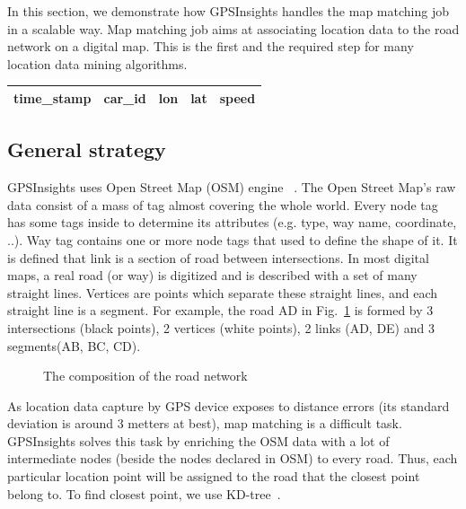 \documentclass{acm_proc_article-sp}
\begin{document}
In this section, we demonstrate how GPSInsights handles the map matching job in a scalable way. Map matching job aims at associating location data to the road network on a digital map. This is the first and the required step for many location data mining algorithms. 

\begin{table}[h]
\centering
\begin{tabular}{|c|c|c|c|c|}
\hline
\textbf{time\_stamp} & \textbf{car\_id} & \textbf{lon}   & \textbf{lat} & \textbf{speed} \\ \hline
\end{tabular}
\end{table}
	
\subsection{General strategy} \label{ssec:links}

GPSInsights uses Open Street Map (OSM) engine ~\cite{openstreetmap}. The Open Street Map's raw data consist of a mass of tag almost covering the whole world. Every node tag has some tags inside to determine its attributes (e.g. type, way name, coordinate, ..). Way tag contains one or more node tags that used to define the shape of it. It is defined that link is a section of road between intersections. In most digital maps, a real road (or way) is digitized and is described with a set of many straight lines. Vertices are points which separate these straight lines, and each straight line is a segment. For example, the road AD in Fig.~\ref{fig:composition} is formed by 3 intersections (black points), 2 vertices (white points), 2 links (AD, DE) and 3 segments(AB, BC, CD).
		
\begin{figure}[h]
\centering
{}
\caption{The composition of the road network}
\label{fig:composition}
\end{figure}
	
As location data capture by GPS device exposes to distance errors (its standard deviation is around 3 metters at best), map matching is a difficult task. GPSInsights solves this task by enriching the OSM data with a lot of intermediate nodes (beside the nodes declared in OSM) to every road. Thus, each particular location point will be assigned to the road that the closest point belong to. To find closest point, we use KD-tree~\cite{moh2013approximate}. 
\end{document}
